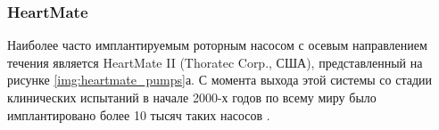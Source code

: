 

\subsubsection*{HeartMate}

Наиболее часто имплантируемым роторным насосом с осевым направлением течения является HeartMate II (Thoratec Corp., США), представленный на рисунке \ref{img:heartmate_pumps}а. С момента выхода этой системы со стадии клинических испытаний в начале 2000-х годов по всему миру было имплантировано более 10 тысяч таких насосов \cite{frazier2017invited}.

